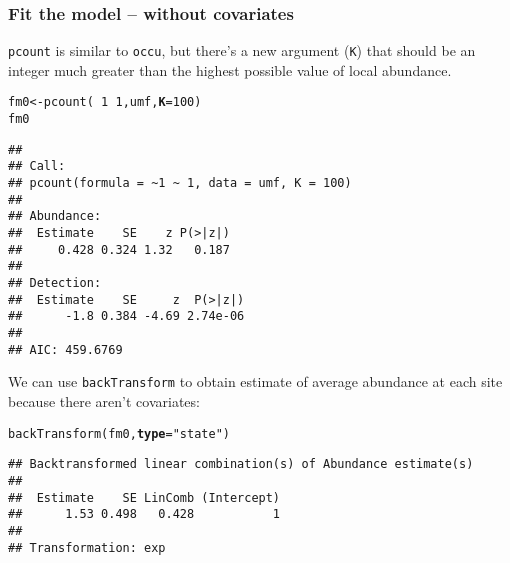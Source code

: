 \documentclass[color=usenames,dvipsnames]{beamer}\usepackage[]{graphicx}\usepackage[]{xcolor}
\makeatletter
\newcommand{\hlnum}[1]{\textcolor[rgb]{0.69,0.494,0}{#1}}%
\newcommand{\hlstr}[1]{\textcolor[rgb]{0.749,0.012,0.012}{#1}}%
\newcommand{\hlopt}[1]{\textcolor[rgb]{0,0,0}{#1}}%
\newcommand{\hlstd}[1]{\textcolor[rgb]{0,0,0}{#1}}%
\newcommand{\hlkwb}[1]{\textcolor[rgb]{0,0.341,0.682}{#1}}%
\newcommand{\hlkwc}[1]{\textcolor[rgb]{0,0,0}{\textbf{#1}}}%
\newcommand{\hlkwd}[1]{\textcolor[rgb]{0.004,0.004,0.506}{#1}}%
\newenvironment{kframe}{%
 \def\at@end@of@kframe{}%
 \ifinner\ifhmode%
  \def\at@end@of@kframe{\end{minipage}}%
  \begin{minipage}{\columnwidth}%
 \fi\fi%
 \def\FrameCommand##1{\hskip\@totalleftmargin \hskip-\fboxsep
 \colorbox{shadecolor}{##1}\hskip-\fboxsep
     \hskip-\linewidth \hskip-\@totalleftmargin \hskip\columnwidth}%
 \MakeFramed {\advance\hsize-\width
   \@totalleftmargin\z@ \linewidth\hsize
   \@setminipage}}%
 {\par\unskip\endMakeFramed%
 \at@end@of@kframe}
\newenvironment{knitrout}{}{} %
\newcommand{\inr}[1]{\colorbox{inlinecolor}{\texttt{#1}}}
\makeatother
\begin{document}
\begin{frame}[fragile]
  \frametitle{Fit the model -- without covariates}
  \footnotesize
  \inr{pcount} is similar to \inr{occu}, but there's a new argument
  (\texttt{K}) that should be an integer much 
  greater than the highest possible value of local abundance. 
\begin{knitrout}\tiny
{}\color{fgcolor}\begin{kframe}
\begin{alltt}
\hlstd{fm0} \hlkwb{<-} \hlkwd{pcount}\hlstd{(}\hlopt{~}\hlnum{1} \hlopt{~}\hlnum{1}\hlstd{, umf,} \hlkwc{K}\hlstd{=}\hlnum{100}\hlstd{)}
\hlstd{fm0}
\end{alltt}
\begin{verbatim}
## 
## Call:
## pcount(formula = ~1 ~ 1, data = umf, K = 100)
## 
## Abundance:
##  Estimate    SE    z P(>|z|)
##     0.428 0.324 1.32   0.187
## 
## Detection:
##  Estimate    SE     z  P(>|z|)
##      -1.8 0.384 -4.69 2.74e-06
## 
## AIC: 459.6769
\end{verbatim}
\end{kframe}
\end{knitrout}
\pause
\vfill
We can use \inr{backTransform} to obtain estimate of average abundance
at each site because there aren't covariates:  
\begin{knitrout}\tiny
{}\color{fgcolor}\begin{kframe}
\begin{alltt}
\hlkwd{backTransform}\hlstd{(fm0,} \hlkwc{type}\hlstd{=}\hlstr{"state"}\hlstd{)}
\end{alltt}
\begin{verbatim}
## Backtransformed linear combination(s) of Abundance estimate(s)
## 
##  Estimate    SE LinComb (Intercept)
##      1.53 0.498   0.428           1
## 
## Transformation: exp
\end{verbatim}
\end{kframe}
\end{knitrout}
\end{frame}
\end{document}
